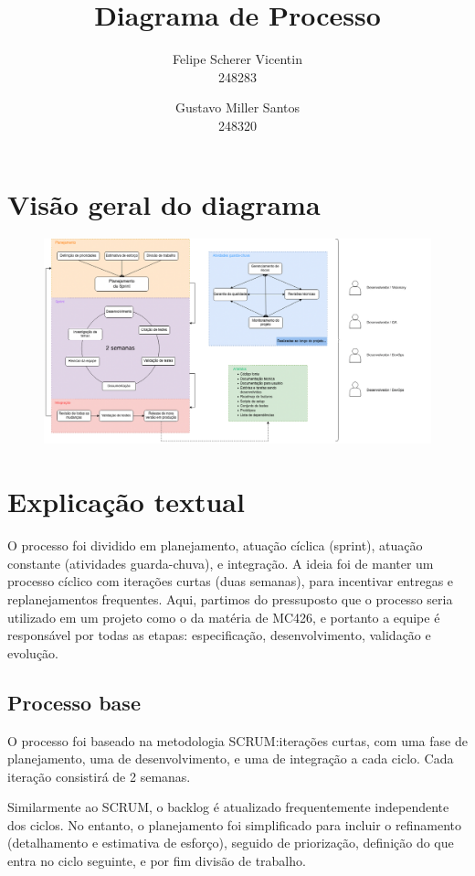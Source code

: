 \documentclass[12pt]{article}
\author{
	Felipe Scherer Vicentin\\
	248283
	\and
	Gustavo Miller Santos\\
	248320
}
\title{Diagrama de Processo}
\begin{document}
\maketitle

\section*{Visão geral do diagrama}

\begin{figure}[H]
	\centering
	\includegraphics[width=\linewidth]{images/process_diagram.png}
\end{figure}

\section*{Explicação textual}

O processo foi dividido em planejamento, atuação cíclica (sprint), atuação constante (atividades guarda-chuva), e integração.
A ideia foi de manter um processo cíclico com iterações curtas (duas semanas), para incentivar entregas e replanejamentos frequentes.
Aqui, partimos do pressuposto que o processo seria utilizado em um projeto como o da matéria de MC426, e portanto a equipe é responsável por todas as etapas: especificação, desenvolvimento, validação e evolução.

\subsection*{Processo base}

O processo foi baseado na metodologia SCRUM:\@ iterações curtas, com uma fase de planejamento, uma de desenvolvimento, e uma de integração a cada ciclo.
Cada iteração consistirá de 2 semanas.

Similarmente ao SCRUM, o backlog é atualizado frequentemente independente dos ciclos.
No entanto, o planejamento foi simplificado para incluir o refinamento (detalhamento e estimativa de esforço), seguido de priorização, definição do que entra no ciclo seguinte, e por fim divisão de trabalho.
\end{document}
